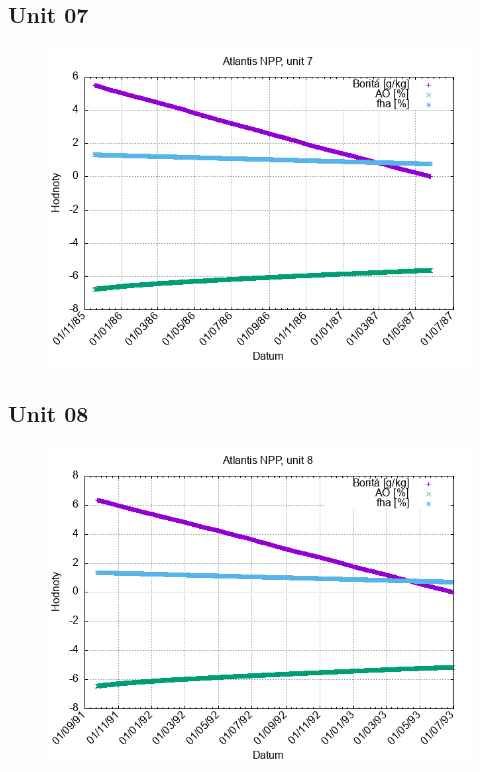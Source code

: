 \documentclass{article}
\begin{document}
\subsection*{Unit 07}
\begin{figure}[h!]
\centering
\includegraphics[width=14cm]{./grafy/Atlantis07.png}
\end{figure}
\clearpage
\subsection*{Unit 08}
\begin{figure}[h!]
\centering
\includegraphics[width=14cm]{./grafy/Atlantis08.png}
\end{figure}
\clearpage
\end{document}
